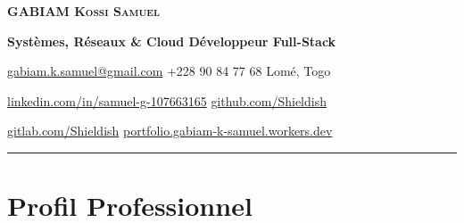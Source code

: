 \documentclass[10pt,a4paper]{article}
\begin{document}
\color{black}


\begin{center}

    {\LARGE\bfseries\scshape GABIAM Kossi Samuel}

    \par
    \vspace{4pt}

    {\normalsize\bfseries
    Systèmes, Réseaux \& Cloud
    \textbullet{}
    Développeur Full-Stack}

    \par
    \vspace{6pt}

    {\small
    \href{mailto:gabiam.k.samuel@gmail.com}
    {gabiam.k.samuel@gmail.com}
    \quad\textbullet\quad
    +228 90 84 77 68
    \quad\textbullet\quad
    Lomé, Togo
    }

    \par
    \vspace{2pt}

    {\small
    \href{https://www.linkedin.com/in/samuel-g-107663165/}
    {linkedin.com/in/samuel-g-107663165}
    \quad\textbullet\quad
    \href{https://github.com/Shieldish}
    {github.com/Shieldish}
    }

    \par
    \vspace{2pt}

    {\small
    \href{https://gitlab.com/Shieldish}
    {gitlab.com/Shieldish}
    \quad\textbullet\quad
    \href{https://portfolio.gabiam-k-samuel.workers.dev/}
    {portfolio.gabiam-k-samuel.workers.dev}
    }

\end{center}

\vspace{-2pt}

\noindent
\rule{\linewidth}{1pt}

\vspace{3pt}


\section{Profil Professionnel}
\end{document}
